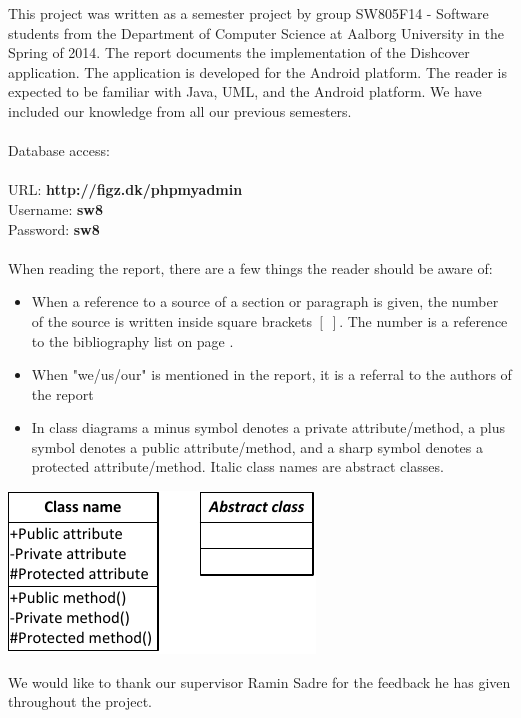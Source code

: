 This project was written as a semester project by group SW805F14 - Software students from the Department of Computer Science at Aalborg University in the Spring of 2014. The report documents the implementation of the Dishcover application. The application is developed for the Android platform. The reader is expected to be familiar with Java, UML, and the Android platform. We have included our knowledge from all our previous semesters.
\\\\
Database access:\\\\
URL: \textbf{http://figz.dk/phpmyadmin}\\
Username: \textbf{sw8}\\
Password: \textbf{sw8}\\\\
When reading the report, there are a few things the reader should be aware of:
\begin{itemize}
\item When a reference to a source of a section or paragraph is given, the number of the source is written inside square brackets $[\;]$. The number is a reference to the bibliography list on page \pageref{chap:bib}.
\item When "we/us/our" is mentioned in the report, it is a referral to the authors of the report
\item In class diagrams a minus symbol denotes a private attribute/method, a plus symbol denotes a public attribute/method, and a sharp symbol denotes a protected attribute/method. Italic class names are abstract classes.
\end{itemize}
\begin{center}
\includegraphics[width=0.35\linewidth]{img/umltheory.pdf}
\end{center}
We would like to thank our supervisor Ramin Sadre for the feedback he has given throughout the project.